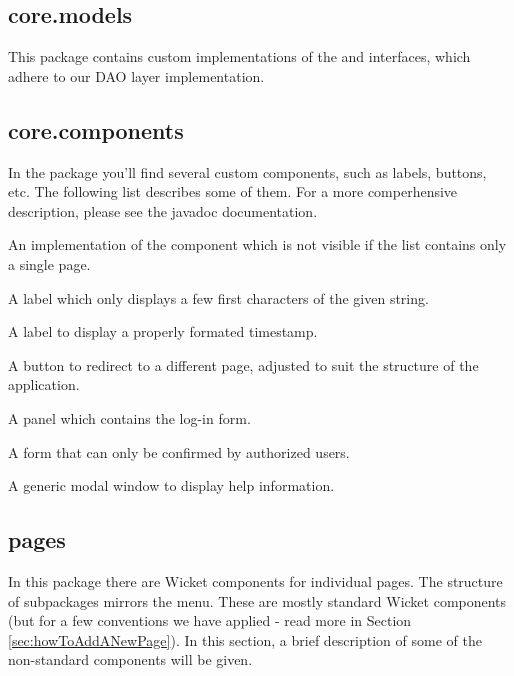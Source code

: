 \subsection{core.models}

This package contains custom implementations of the  and  interfaces, which adhere to our DAO layer implementation.

\subsection{core.components}

In the  package you'll find several custom components, such as labels, buttons, etc. The following list describes some of them. For a more comperhensive description, please see the javadoc documentation.

\begin{description}[style=nextline,font=\ttfamily]
	\item[UnobtrusivePagingNavigator] An implementation of the  component which is not visible if the list contains only a single page.
	\item[TruncatedLabel] A label which only displays a few first characters of the given string.
	\item[TimestampLabel] A label to display a properly formated timestamp.
	\item[RedirectButton] A button to redirect to a different page, adjusted to suit the structure of the \FE application.
	\item[LogInPanel] A panel which contains the log-in form.
	\item[LimitedEditingForm] A form that can only be confirmed by authorized users.
	\item[HelpWindow] A generic modal window to display help information.
\end{description}

\subsection{pages}

In this package there are Wicket components for individual pages. The structure of subpackages mirrors the \FE menu. These are mostly standard Wicket components (but for a few conventions we have applied - read more in Section \ref{sec:howToAddANewPage}). In this section, a brief description of some of the non-standard components will be given.

